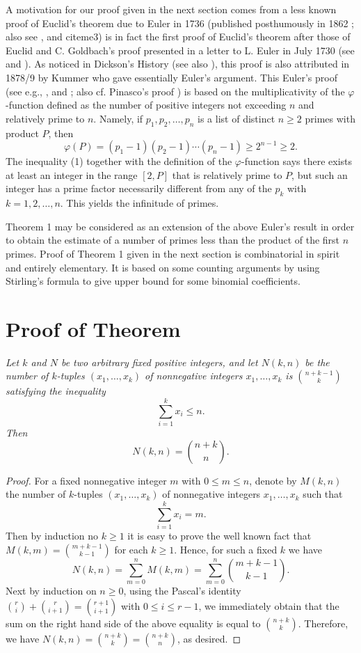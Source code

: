 \documentclass[12pt]{amsart}
\begin{document}
A motivation for our proof given in the next section comes 
from a  less known proof   of Euclid's theorem 
due to Euler  in 1736 (published posthumously in 1862 
\cite{eu1}; also see \cite[Sect. 135]{eu2}, \cite[p. 413]{d}
and cite{me3})  is in fact the first proof of Euclid's theorem after those of Euclid
and C. Goldbach's proof presented in a letter to L. Euler in  July 1730  
(see \cite[p. 6]{r2} and \cite[Appendix C)]{me}).
As noticed in Dickson's History  \cite[p. 413]{d} 
(see also \cite[page 80]{sc}), this proof is also attributed in 
1878/9 by Kummer \cite{k} who gave essentially Euler's argument. 
 This Euler's proof (see e.g., \cite[pp. 134--135]{bu}, \cite{me3}
and \cite[page 3]{pol}; also cf. Pinasco's proof \cite{p}) 
is based on the multiplicativity of the $\varphi$-function 
defined as the number of positive integers not exceeding $n$ and relatively 
prime to $n$. Namely, if $p_1,p_2,\ldots,p_n$ is a list of distinct $n\ge 2$ 
primes with product $P$,  then 
  \begin{equation}
\varphi(P)=(p_1-1)(p_2-1)\cdots (p_n-1)\ge 2^{n-1}\ge 2.
  \end{equation}
The inequality (1) together with the definition of the $\varphi$-function
says there exists at least an integer in the range $[2,P]$ 
that is relatively prime to $P$, but such an integer has a prime 
factor necessarily different from any of the $p_k$ with $k=1,2,\ldots,n$.
This yields the infinitude of primes.

Theorem 1 may be considered as an extension of the above Euler's result 
in order to obtain  the estimate of a number of primes less than 
the product of the first $n$ primes.
Proof of Theorem 1 given in the next section is combinatorial in spirit and 
entirely elementary. It is based on some counting arguments by using 
Stirling's formula to give upper bound for some binomial coefficients.

  \section{Proof of Theorem}

 {\it Let $k$ and $N$ 
be two arbitrary fixed positive integers, and let $N(k,n)$ 
be the number of $k$-tuples  $(x_1,\ldots,x_k)$ of nonnegative 
integers $x_1,\ldots,x_k$ is ${n+k-1\choose k}$ satisfying
the inequality
  $$
\sum_{i=1}^kx_i\le n.
  $$
Then 
 $$
N(k,n)={n+k\choose n}.
 $$}
\begin{proof} 
For a fixed nonnegative integer $m$ with $0\le m\le n$,
denote by $M(k,n)$ the number of $k$-tuples  
$(x_1,\ldots,x_k)$ of nonnegative integers $x_1,\ldots,x_k$ such that
  $$
\sum_{i=1}^kx_i=m.
  $$
Then by induction no $k\ge 1$ it is easy to prove the  well known fact 
that $M(k,m)={m+k-1\choose k-1}$ for each $k\ge 1$. Hence, for such a fixed
$k$ we have
   $$
N(k,n)=\sum_{m=0}^nM(k,m)=\sum_{m=0}^n{m+k-1\choose k-1}.
   $$
Next by induction on $n\ge 0$, using the Pascal's identity
${r\choose i}+{r\choose i+1}={r+1\choose i+1}$ with $0\le i\le r-1$,
we immediately obtain that the sum on the right hand side of the above 
equality is equal to ${n+k\choose k}$. Therefore, we have
$N(k,n)={n+k\choose k}={n+k\choose n}$, as desired.
\end{proof}
\end{document}
